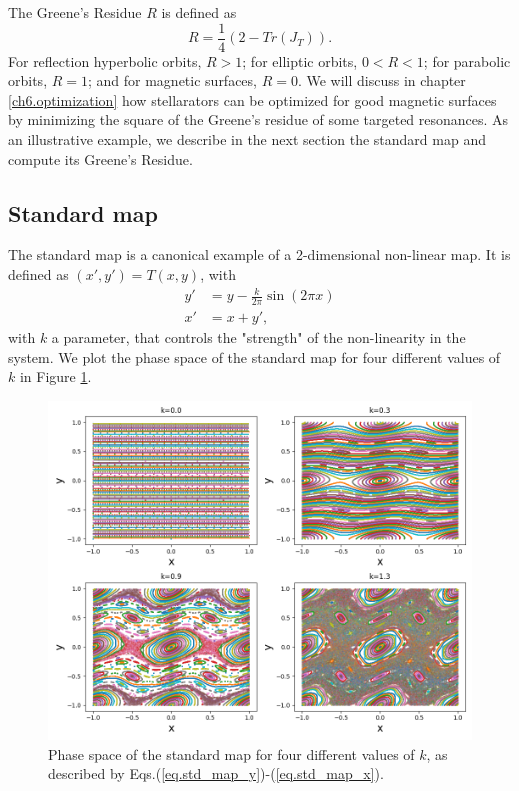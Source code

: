 \documentclass[my_thesis.tex]{subfiles}
\begin{document}
The Greene's Residue $R$ is defined as
\begin{equation}
	R = \frac{1}{4}\left(2-Tr(J_T)\right).
\end{equation}
For reflection hyperbolic orbits, $R>1$; for elliptic orbits, $0<R<1$; for parabolic orbits, $R=1$; and for magnetic surfaces, $R=0$. We will discuss in chapter \ref{ch6.optimization} how stellarators can be optimized for good magnetic surfaces by minimizing the square of the Greene's residue of some targeted resonances. As an illustrative example, we describe in the next section the standard map and compute its Greene's Residue.

\subsection{Standard map}
The standard map is a canonical example of a 2-dimensional non-linear map. It is defined as $(x',y')= T(x,y)$, with
\begin{align}
	y' &= y - \frac{k}{2\pi}\sin(2\pi x) \label{eq.std_map_y}\\
	x' &= x + y', \label{eq.std_map_x}
\end{align} 
with $k$ a parameter, that controls the "strength" of the non-linearity in the system. We plot the phase space of the standard map for four different values of $k$ in Figure \ref{fig.std map phase space}. 

\begin{figure}
	\centering
	\includegraphics[width=\linewidth]{images/std_map_phase_space.png}
	\caption{Phase space of the standard map for four different values of $k$, as described by Eqs.(\ref{eq.std_map_y})-(\ref{eq.std_map_x}).}
	\label{fig.std map phase space}
\end{figure}
\end{document}
